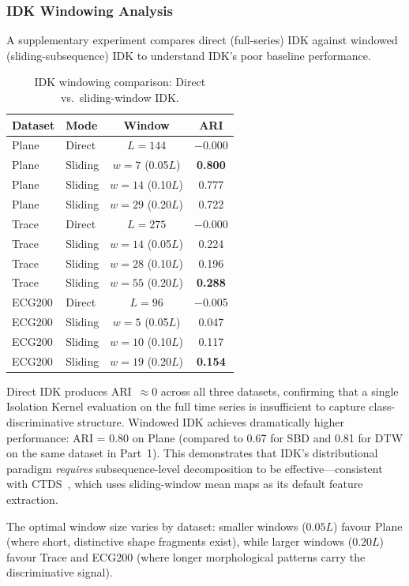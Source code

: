 \subsubsection{IDK Windowing Analysis}\label{sec:results-idk-windowing}

A supplementary experiment compares direct (full-series) IDK against windowed (sliding-subsequence) IDK to understand IDK's poor baseline performance.

\begin{table}[htbp]
\centering
\caption{IDK windowing comparison: Direct vs.\ sliding-window IDK.}\label{tab:idk-windowing}
\small
\begin{tabular}{l l c c}
\toprule
Dataset & Mode & Window & ARI \\
\midrule
Plane   & Direct  & $L=144$ & $-$0.000 \\
Plane   & Sliding & $w=7$ (0.05$L$) & \textbf{0.800} \\
Plane   & Sliding & $w=14$ (0.10$L$) & 0.777 \\
Plane   & Sliding & $w=29$ (0.20$L$) & 0.722 \\
\midrule
Trace   & Direct  & $L=275$ & $-$0.000 \\
Trace   & Sliding & $w=14$ (0.05$L$) & 0.224 \\
Trace   & Sliding & $w=28$ (0.10$L$) & 0.196 \\
Trace   & Sliding & $w=55$ (0.20$L$) & \textbf{0.288} \\
\midrule
ECG200  & Direct  & $L=96$ & $-$0.005 \\
ECG200  & Sliding & $w=5$ (0.05$L$) & 0.047 \\
ECG200  & Sliding & $w=10$ (0.10$L$) & 0.117 \\
ECG200  & Sliding & $w=19$ (0.20$L$) & \textbf{0.154} \\
\bottomrule
\end{tabular}
\end{table}

Direct IDK produces ARI~$\approx 0$ across all three datasets, confirming that a single Isolation Kernel evaluation on the full time series is insufficient to capture class-discriminative structure.
Windowed IDK achieves dramatically higher performance: ARI = 0.80 on Plane (compared to 0.67 for SBD and 0.81 for DTW on the same dataset in Part~1).
This demonstrates that IDK's distributional paradigm \emph{requires} subsequence-level decomposition to be effective---consistent with CTDS~\cite{gong2024ctds}, which uses sliding-window mean maps as its default feature extraction.

The optimal window size varies by dataset: smaller windows ($0.05L$) favour Plane (where short, distinctive shape fragments exist), while larger windows ($0.20L$) favour Trace and ECG200 (where longer morphological patterns carry the discriminative signal).
